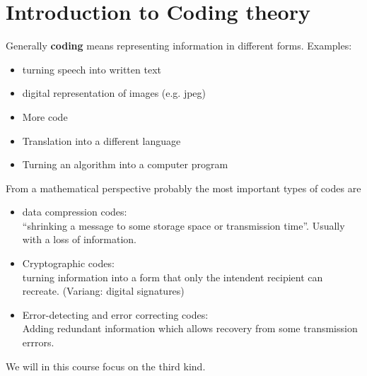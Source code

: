 \documentclass[english]{lbscript}
\begin{document}
\section{Introduction to Coding theory}
\label{sec:coding-theory}

Generally \textbf{coding} means representing information in different forms. Examples:
\begin{itemize}
  \item turning speech into written text
  \item digital representation of images (e.g. jpeg)
  \item More code
  \item Translation into a different language
  \item Turning an algorithm into a computer program
\end{itemize}

From a mathematical perspective probably the most important types of codes are
\begin{itemize}
  \item data compression codes: \\
        \enquote{shrinking a message to some storage space or transmission time}. Usually with a loss of information.
  \item Cryptographic codes:\\ turning information into a form that only the intendent recipient can recreate. (Variang: digital signatures)
  \item Error-detecting and error correcting codes:\\
        Adding redundant information which allows recovery from some transmission errrors.
\end{itemize}
We will in this course focus on the third kind.
\end{document}

